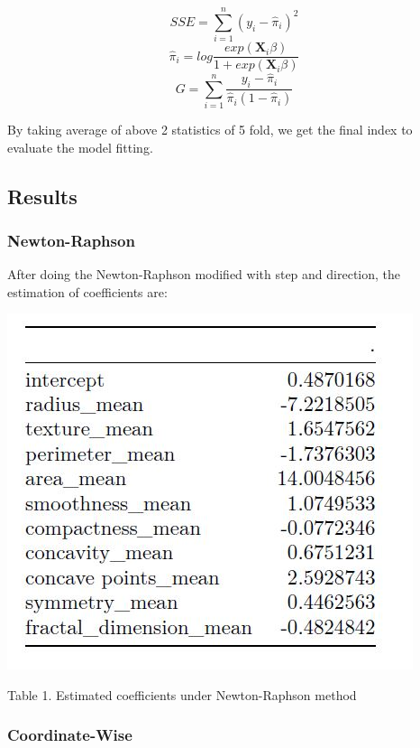 \documentclass[]{article}
\begin{document}
\[SSE = \sum_{i=1}^{n}(y_i-{\widehat \pi_i})^2\]
\[{\widehat \pi_i} = log\frac{exp({\boldsymbol X_i\beta})}{1+exp({\boldsymbol X_i\beta})}\]
\[G = \sum_{i=1}^{n}\frac{y_i-{\widehat \pi_i}}{{\widehat \pi_i}(1-{\widehat \pi_i})}\]

By taking average of above 2 statistics of 5 fold, we get the final
index to evaluate the model fitting.

\hypertarget{results}{%
\subsection{Results}\label{results}}

\hypertarget{newton-raphson}{%
\subsubsection{Newton-Raphson}\label{newton-raphson}}

After doing the Newton-Raphson modified with step and direction, the
estimation of coefficients are:

\begin{center}
\includegraphics{./results/NR.JPG}
\end{center}

\begin{center}
Table 1. Estimated coefficients under Newton-Raphson method
\end{center}

\hypertarget{coordinate-wise}{%
\subsubsection{Coordinate-Wise}\label{coordinate-wise}}
\end{document}

